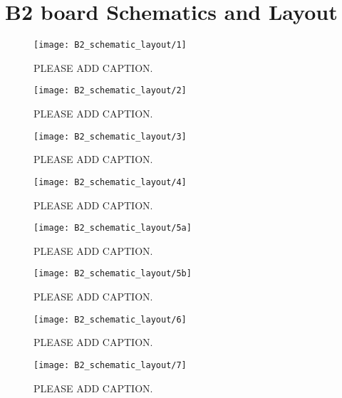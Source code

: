 \chapter{B2 board Schematics and Layout}

\begin{figure}
 \centering
 \texttt{[image: B2\_schematic\_layout/1]}
 \caption{PLEASE ADD CAPTION.}
 \label{fig:b2_sch_lo_1}
\end{figure}

\begin{figure}
 \centering
 \texttt{[image: B2\_schematic\_layout/2]}
 \caption{PLEASE ADD CAPTION.}
 \label{fig:b2_sch_lo_2}
\end{figure}

\begin{figure}
 \centering
 \texttt{[image: B2\_schematic\_layout/3]}
 \caption{PLEASE ADD CAPTION.}
 \label{fig:b2_sch_lo_3}
\end{figure}

\begin{figure}
 \centering
 \texttt{[image: B2\_schematic\_layout/4]}
 \caption{PLEASE ADD CAPTION.}
 \label{fig:b2_sch_lo_4}
\end{figure}

\begin{figure}
 \centering
 \texttt{[image: B2\_schematic\_layout/5a]}
 \caption{PLEASE ADD CAPTION.}
 \label{fig:b2_sch_lo_5a}
\end{figure}

\begin{figure}
 \centering
 \texttt{[image: B2\_schematic\_layout/5b]}
 \caption{PLEASE ADD CAPTION.}
 \label{fig:b2_sch_lo_5b}
\end{figure}

\begin{figure}
 \centering
 \texttt{[image: B2\_schematic\_layout/6]}
 \caption{PLEASE ADD CAPTION.}
 \label{fig:b2_sch_lo_6}
\end{figure}

\begin{figure}
 \centering
 \texttt{[image: B2\_schematic\_layout/7]}
 \caption{PLEASE ADD CAPTION.}
 \label{fig:b2_sch_lo_7}
\end{figure}